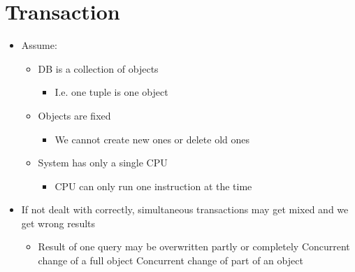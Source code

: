 
\section{Transaction}
\begin{itemize}
        \begin{itemize}
            \item Assume:
                \begin{itemize}
                    \item DB is a collection of objects
                        \begin{itemize}
                            \item I.e. one tuple is one object
                        \end{itemize}
                    \item Objects are fixed
                        \begin{itemize}
                            \item We cannot create new ones or delete old ones
                        \end{itemize}
                    \item System has only a single CPU
                        \begin{itemize}
                            \item CPU can only run one instruction at the time
                        \end{itemize}
                \end{itemize}
            \item If not dealt with correctly, simultaneous transactions may get mixed and we get wrong results
                \begin{itemize}
                     One way of mixing instructions
                        \begin{itemize}
                            \item Different schedules may result in different results
                        \end{itemize}
                    \item Result of one query may be overwritten partly or completely
                     Concurrent change of a full object
                     Concurrent change of part of an object

\end{itemize}
\end{itemize}
\end{itemize}
